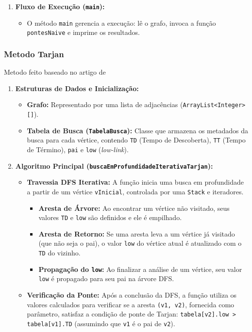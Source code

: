 \documentclass[12pt]{article}
\begin{document}
\begin{enumerate}
    \item \textbf{Fluxo de Execu\c{c}\~ao (\texttt{main}):}
    \begin{itemize}
        \item O m\'etodo \texttt{main} gerencia a execu\c{c}\~ao: l\^e o grafo, invoca a fun\c{c}\~ao \texttt{pontesNaive} e imprime os resultados.
    \end{itemize}
\end{enumerate}

\subsubsection{Metodo Tarjan}

Metodo feito baseado no artigo de \cite{Tarjan1974}

\begin{enumerate}
    \item \textbf{Estruturas de Dados e Inicializa\c{c}\~ao:}
    \begin{itemize}
        \item \textbf{Grafo:} Representado por uma lista de adjac\^encias (\texttt{ArrayList<Integer>[]}).
        \item \textbf{Tabela de Busca (\texttt{TabelaBusca}):} Classe que armazena os metadados da busca para cada v\'ertice, contendo \texttt{TD} (Tempo de Descoberta), \texttt{TT} (Tempo de T\'ermino), \texttt{pai} e \texttt{low} (\textit{low-link}).
    \end{itemize}

    \item \textbf{Algoritmo Principal (\texttt{buscaEmProfundidadeIterativaTarjan}):}
    \begin{itemize}
        \item \textbf{Travessia DFS Iterativa:} A fun\c{c}\~ao inicia uma busca em profundidade a partir de um v\'ertice \texttt{vInicial}, controlada por uma \texttt{Stack} e iteradores.
        \begin{itemize}
            \item \textbf{Aresta de \'Arvore:} Ao encontrar um v\'ertice n\~ao visitado, seus valores \texttt{TD} e \texttt{low} s\~ao definidos e ele \'e empilhado.
            \item \textbf{Aresta de Retorno:} Se uma aresta leva a um v\'ertice j\'a visitado (que n\~ao seja o pai), o valor \texttt{low} do v\'ertice atual \'e atualizado com o \texttt{TD} do vizinho.
            \item \textbf{Propaga\c{c}\~ao do \texttt{low}:} Ao finalizar a an\'alise de um v\'ertice, seu valor \texttt{low} \'e propagado para seu pai na \'arvore DFS.
        \end{itemize}
        \item \textbf{Verifica\c{c}\~ao da Ponte:} Ap\'os a conclus\~ao da DFS, a fun\c{c}\~ao utiliza os valores calculados para verificar se a aresta \texttt{(v1, v2)}, fornecida como par\^ametro, satisfaz a condi\c{c}\~ao de ponte de Tarjan: \texttt{tabela[v2].low > tabela[v1].TD} (assumindo que \texttt{v1} \'e o pai de \texttt{v2}).
    \end{itemize}


\end{enumerate}
\end{document}
